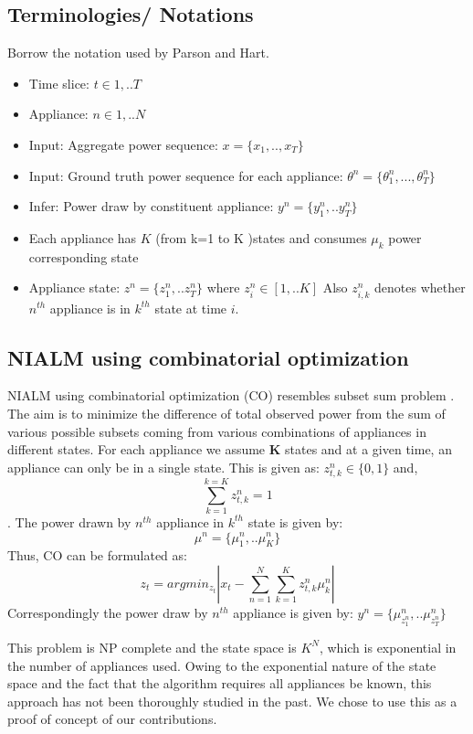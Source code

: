 \documentclass[conference]{IEEEtran}
\begin{document}
\subsection{Terminologies/ Notations}
Borrow the notation used by Parson and Hart.
\begin{itemize}
\item Time slice: $t\in {1,..T}$
\item Appliance: $n\in{1,..N}$
\item Input: Aggregate power sequence: $x=\{ x_1,..,x_T\}$
\item Input: Ground truth power sequence for each appliance: $\theta^n=\{\theta_1^n,...,\theta_T^n\}$
\item Infer: Power draw by constituent appliance: $y^n=\{y_1^n,..y_T^n\}$
\item Each appliance has $K$ (from k=1 to K )states and consumes $\mu_k$ power corresponding state
\item Appliance state: $z^n=\{z_1^n,..z_T^n\}$ where  $z_i^n \in [1,..K]$ Also $z_{i,k}^n$ denotes whether $n^{th}$ appliance is in $k^{th}$ state at time $i$.
\end{itemize}

\subsection{NIALM using combinatorial optimization}
NIALM using combinatorial optimization (CO) resembles subset sum problem \cite{knapsack}. The aim is to minimize the difference of total observed power from the sum of various possible subsets coming from various combinations of appliances in different states. For each appliance we assume \textbf{K} states and at a given time, an appliance can only be in a single state. This is given as: 
$z_{t,k}^n\in\{0,1\} $ and, $$\sum\limits_{k=1}^{k=K} z_{t,k}^n=1$$. The power drawn by $n^{th}$ appliance in $k^{th}$ state is given by:
$$\mu^n=\{\mu_1^n,..\mu_K^n\}$$ Thus, CO can be formulated as:
$$z_t=arg min_{z_t}|x_t-\sum\limits_{n=1}^{N}\sum\limits_{k=1}^{K}z_{t,k}^n\mu_k^n|$$
Correspondingly the power draw by $n^{th}$ appliance is given by: $y^n=\{\mu_{z_1^n}^n,..\mu_{z_T^n}^n \}$

This problem is NP complete and the state space is $K^N$, which is exponential in the number of appliances used. Owing to the exponential nature of the state space and the fact that the algorithm requires all appliances be known, this approach has not been thoroughly studied in the past. We chose to use this as a proof of concept of our contributions.
\end{document}
